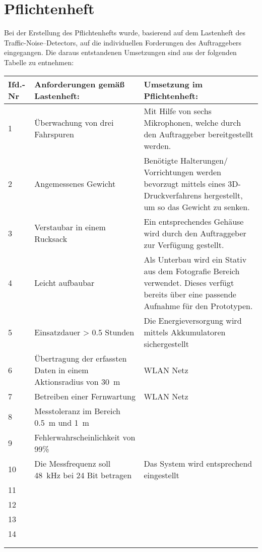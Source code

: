 \section{Pflichtenheft}

Bei der Erstellung des Pflichtenhefts wurde, basierend auf dem Lastenheft des Traffic-Noise--Detectors, auf die individuellen Forderungen des Auftraggebers eingegangen. Die daraus entstandenen Umsetzungen sind aus der folgenden Tabelle zu entnehmen:

\begin{center}
\begin{tabular}{|p{2cm}|p{6cm}|p{6cm}|}
\hline
\textbf{Ifd.-Nr} & \textbf{Anforderungen gemäß Lastenheft:} & \textbf{Umsetzung im Pflichtenheft:}\\
\hline
1 & Überwachung von drei Fahrspuren & Mit Hilfe von sechs Mikrophonen, welche durch den Auftraggeber bereitgestellt werden.\\
\hline
2 & Angemessenes Gewicht & Benötigte Halterungen/ Vorrichtungen werden bevorzugt mittels eines 3D-Druckverfahrens hergestellt, um so das Gewicht zu senken. \hfill\\
\hline
3 & Verstaubar in einem Rucksack & Ein entsprechendes Gehäuse wird durch den Auftraggeber zur Verfügung gestellt. \\
\hline
4 & Leicht aufbaubar & Als Unterbau wird ein Stativ aus dem Fotografie Bereich verwendet. Dieses verfügt bereits über eine passende Aufnahme für den Prototypen.\\
\hline
5 & Einsatzdauer > 0.5 Stunden & Die Energieversorgung wird mittels Akkumulatoren sichergestellt \\
\hline
6 & Übertragung der erfassten Daten in einem Aktionsradius von \SI{30}{m} & WLAN Netz \\
\hline
7 & Betreiben einer Fernwartung & WLAN Netz\\
\hline
8 & Messtoleranz im Bereich \SI{0,5}{m} und \SI{1}{m} & \\
\hline
9 & Fehlerwahrscheinlichkeit von 99\% & \\
\hline
10 & Die Messfrequenz soll \SI{48}{kHz} bei 24 Bit betragen \hfill & Das System wird entsprechend eingestellt \hfill \\
\hline
11 &&\\
\hline
12 &&\\
\hline
13 &&\\
\hline
14 &&\\
\hline
&&\\
\hline
&&\\
\end{tabular}
\end{center}